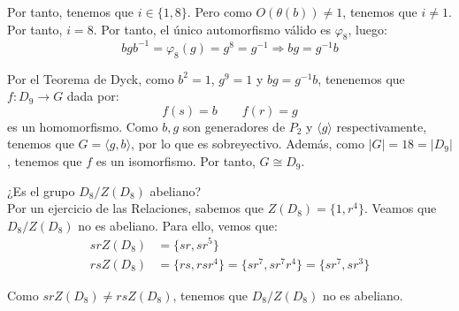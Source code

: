 \documentclass[12pt]{article}
\begin{document}
\begin{ejercicio}
        Por tanto, tenemos que $i\in \{1,8\}$. Pero como $O(\theta(b))\neq 1$, tenemos que $i\neq 1$. Por tanto, $i=8$. Por tanto, el único automorfismo válido es $\varphi_8$, luego:
        \begin{equation*}
            bgb^{-1} = \varphi_8(g) = g^8 = g^{-1}\Longrightarrow bg = g^{-1}b
        \end{equation*}

        Por el Teorema de Dyck, como $b^2=1$, $g^9=1$ y $bg=g^{-1}b$, tenenemos que $f:D_9 \to G$ dada por:
        \begin{equation*}
            f(s) = b\qquad f(r)= g
        \end{equation*}
        es un homomorfismo. Como $b,g$ son generadores de $P_2$ y $\langle g\rangle $ respectivamente, tenemos que $G=\langle g,b\rangle $, por lo que es sobreyectivo. Además, como $|G|=18=|D_9|$, tenemos que $f$ es un isomorfismo. Por tanto, $G\cong D_9$.
    \end{ejercicio}

    \begin{ejercicio}
        ¿Es el grupo $D_8 /Z(D_8)$ abeliano?\\

        Por un ejercicio de las Relaciones, sabemos que $Z(D_8) = \{1, r^4\}$. Veamos que $D_8 /Z(D_8)$ no es abeliano. Para ello, vemos que:
        \begin{align*}
            srZ(D_8) & = \{sr, sr^5\}\\
            rsZ(D_8) & = \{rs, rsr^4\} = \{sr^7, sr^7r^4\} = \{sr^7, sr^3\}
        \end{align*}

        Como $srZ(D_8)\neq rsZ(D_8)$, tenemos que $D_8 /Z(D_8)$ no es abeliano.
    \end{ejercicio}
\end{document}
